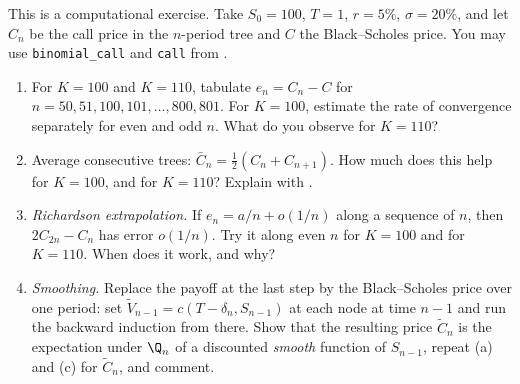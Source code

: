 \begin{exercise}\label{ex:bs-rate}
\medium This is a computational exercise. Take $S_0=100$, $T=1$, $r=5\%$, $\sigma=20\%$, and
let $C_n$ be the call price in the $n$-period tree  and $C$ the
Black--Scholes price. You may use \texttt{binomial\_call} and \texttt{call} from
.
\begin{enumerate}[label=(\alph*)]
  \item For $K=100$ and $K=110$, tabulate $e_n=C_n-C$ for $n=50,51,100,101,\dots,800,801$.
    For $K=100$, estimate the rate of convergence separately for even and odd $n$. What do
    you observe for $K=110$?
  \item Average consecutive trees: $\bar C_n=\frac12(C_n+C_{n+1})$. How much does this help for
    $K=100$, and for $K=110$? Explain with .
  \item \emph{Richardson extrapolation.} If $e_n=a/n+o(1/n)$ along a sequence of $n$, then
    $2C_{2n}-C_n$ has error $o(1/n)$. Try it along even $n$ for $K=100$ and for $K=110$. When
    does it work, and why?
  \item \emph{Smoothing.} Replace the payoff at the last step by the Black--Scholes price
    over one period: set $\tilde V_{n-1}=c(T-\delta_n,S_{n-1})$ at each node at time $n-1$ and
    run the backward induction  from there. Show that the
    resulting price $\tilde C_n$ is the expectation under $\Q_n$ of a discounted
    \emph{smooth} function of $S_{n-1}$, repeat (a) and (c) for $\tilde C_n$, and comment.
\end{enumerate}
\end{exercise}
